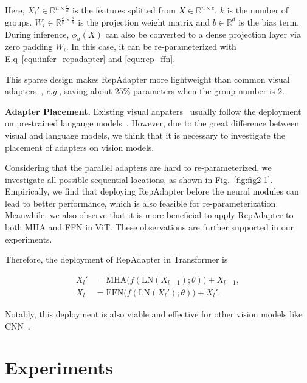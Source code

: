 Here, $X_i' \in \mathbb{R}^{n\times\frac{c}{k}}$ is the   features splitted from $X \in \mathbb{R}^{n\times c}$, $k$ is the number of groups.  $W_i \in \mathbb{R}^{\frac{c}{k}\times\frac{d}{k}}$ is the projection weight  matrix and $b \in \mathbb{R}^d$ is the bias term.   During inference, $\phi_u(X)$ can also be converted to a dense projection layer via zero padding $W_i$. In this case, it can be  re-parameterized with E.q~\ref{equ:infer_repadapter} and \ref{equ:rep_ffn}.

 This sparse design makes RepAdapter  more lightweight than common visual adapters~\cite{adapter,adaptformer}, \emph{e.g.},  saving about 25\% parameters when the group number is 2.

\textbf{Adapter Placement.} Existing visual adpaters~\cite{noah} usually follow the deployment on pre-trained langauge models~\cite{adapter}. However, due to the great difference between visual and language models, we think that it is necessary to investigate the placement of adapters on vision models. 

Considering that the parallel adapters are hard to re-parameterized, we investigate  all possible sequential  locations, as  shown  in Fig.~\ref{fig:fig2-1}. Empirically, we find that deploying RepAdapter before the neural modules can lead to better performance, which is also feasible for re-parameterization.       Meanwhile,  we also observe that it is more beneficial to  apply RepAdapter to both MHA and FFN  in ViT.    These observations are further supported in our experiments. 

 Therefore, the deployment of RepAdapter  in Transformer  is

\begin{equation}
\label{equ:pre_insert}
\begin{aligned}
X_l'&=\text{MHA}\big(f(\text{LN}(X_{l-1});\theta)\big)+X_{l-1},\\
X_l&=\text{FFN}\big(f(\text{LN}(X_l');\theta)\big)+X_l'.
\end{aligned}
\end{equation}

Notably, this deployment  is also viable and effective for other vision models like CNN~\cite{convnext}. 

 \section{Experiments}
